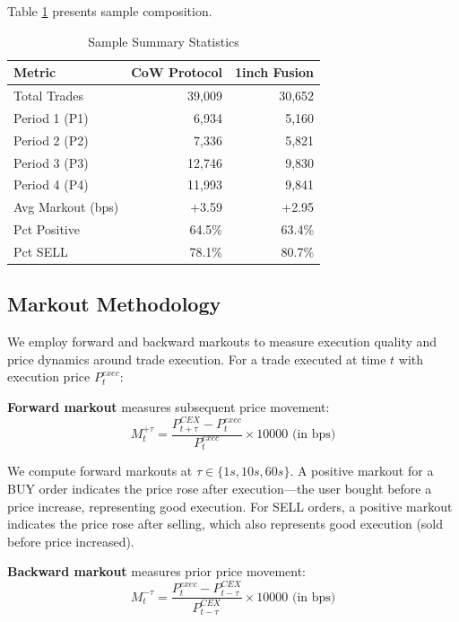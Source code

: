 \documentclass[12pt,a4paper]{article}
\begin{document}
Table \ref{tab:sample_summary} presents sample composition.

\begin{table}[H]
\centering
\caption{Sample Summary Statistics}
\label{tab:sample_summary}
\begin{tabular}{lrr}
\toprule
\textbf{Metric} & \textbf{CoW Protocol} & \textbf{1inch Fusion} \\
\midrule
Total Trades & 39,009 & 30,652 \\
Period 1 (P1) & 6,934 & 5,160 \\
Period 2 (P2) & 7,336 & 5,821 \\
Period 3 (P3) & 12,746 & 9,830 \\
Period 4 (P4) & 11,993 & 9,841 \\
\midrule
Avg Markout (bps) & +3.59 & +2.95 \\
Pct Positive & 64.5\% & 63.4\% \\
Pct SELL & 78.1\% & 80.7\% \\
\bottomrule
\end{tabular}
\end{table}

\subsection{Markout Methodology}

We employ forward and backward markouts to measure execution quality and price dynamics around trade execution. For a trade executed at time $t$ with execution price $P_t^{exec}$:

\textbf{Forward markout} measures subsequent price movement:
\begin{equation}
M_t^{+\tau} = \frac{P_{t+\tau}^{CEX} - P_t^{exec}}{P_t^{exec}} \times 10000 \text{ (in bps)}
\end{equation}

We compute forward markouts at $\tau \in \{1s, 10s, 60s\}$. A positive markout for a BUY order indicates the price rose after execution---the user bought before a price increase, representing good execution. For SELL orders, a positive markout indicates the price rose after selling, which also represents good execution (sold before price increased).

\textbf{Backward markout} measures prior price movement:
\begin{equation}
M_t^{-\tau} = \frac{P_t^{exec} - P_{t-\tau}^{CEX}}{P_{t-\tau}^{CEX}} \times 10000 \text{ (in bps)}
\end{equation}
\end{document}
